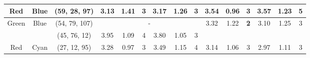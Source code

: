 \begin{table}[htbp]
{\begin{tabular}{@{}ccclcccccccccccc@{}}
    Red                     & \multicolumn{1}{c|}{Blue}                      & \multicolumn{2}{c|}{\cellcolor[HTML]{FF00FF}(59, 28, 97)}  & \multicolumn{1}{c|}{3.13} & \multicolumn{1}{c|}{1.41}  & \multicolumn{1}{c|}{3}                                  & \multicolumn{1}{c|}{3.17} & \multicolumn{1}{c|}{1.26}  & \multicolumn{1}{c|}{3}                                  & \multicolumn{1}{c|}{3.54}                   & \multicolumn{1}{c|}{0.96}                   & \multicolumn{1}{c|}{3}                                  & \multicolumn{1}{c|}{3.57}                   & \multicolumn{1}{c|}{1.23}                   & \multicolumn{1}{c|}{\cellcolor[HTML]{32CB00}\textbf{5}}                   \\ \midrule
    Green                   & \multicolumn{1}{c|}{Blue}                      & \multicolumn{2}{c|}{\cellcolor[HTML]{00FFFF}(54, 79, 107)} & \multicolumn{6}{c|}{-}                                                                                                                                                                                                              & \multicolumn{1}{c|}{3.32}                   & \multicolumn{1}{c|}{1.22}                   & \multicolumn{1}{c|}{\cellcolor[HTML]{FD6864}\textbf{2}} & \multicolumn{1}{c|}{3.10}                   & \multicolumn{1}{c|}{1.25}                   & \multicolumn{1}{c|}{3}                                                    \\ \midrule
                            & \multicolumn{1}{c|}{}                          & \multicolumn{2}{c|}{\cellcolor[HTML]{80FF00}(45, 76, 12)}  & \multicolumn{1}{c|}{3.95} & \multicolumn{1}{c|}{1.09}  & \multicolumn{1}{c|}{4}                                  & \multicolumn{1}{c|}{3.80} & \multicolumn{1}{c|}{1.05}  & \multicolumn{1}{c|}{3}                                  & \multicolumn{1}{c|}{}                       & \multicolumn{1}{c|}{}                       & \multicolumn{1}{c|}{}                                   & \multicolumn{1}{c|}{}                       & \multicolumn{1}{c|}{}                       & \multicolumn{1}{c|}{}                                                     \\ \cmidrule(lr){3-10}
    \multirow{-2}{*}{Red}   & \multicolumn{1}{c|}{\multirow{-2}{*}{Cyan}}    & \multicolumn{2}{c|}{\cellcolor[HTML]{7F00FF}(27, 12, 95)}  & \multicolumn{1}{c|}{3.28} & \multicolumn{1}{c|}{0.97}  & \multicolumn{1}{c|}{3}                                  & \multicolumn{1}{c|}{3.49} & \multicolumn{1}{c|}{1.15}  & \multicolumn{1}{c|}{4}                                  & \multicolumn{1}{c|}{\multirow{-2}{*}{3.14}} & \multicolumn{1}{c|}{\multirow{-2}{*}{1.06}} & \multicolumn{1}{c|}{\multirow{-2}{*}{3}}                & \multicolumn{1}{c|}{\multirow{-2}{*}{2.97}} & \multicolumn{1}{c|}{\multirow{-2}{*}{1.11}} & \multicolumn{1}{c|}{\multirow{-2}{*}{3}}                                  \\ \midrule

\end{tabular}}
\end{table}
